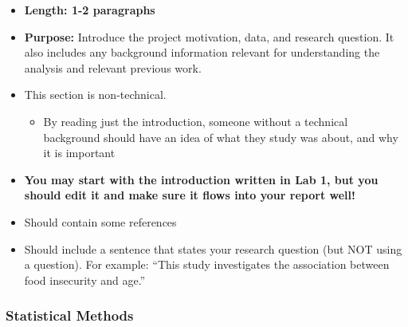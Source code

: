 \documentclass[
  letterpaper,
  DIV=11,
  numbers=noendperiod]{scrartcl}
\providecommand{\tightlist}{%
  \setlength{\itemsep}{0pt}\setlength{\parskip}{0pt}}\usepackage{longtable,booktabs,array}
\begin{document}
\begin{itemize}
\tightlist
\item
  \textbf{Length: 1-2 paragraphs}
\item
  \textbf{Purpose:} Introduce the project motivation, data, and research
  question. It also includes any background information relevant for
  understanding the analysis and relevant previous work.
\item
  This section is non-technical.

  \begin{itemize}
  \tightlist
  \item
    By reading just the introduction, someone without a technical
    background should have an idea of what they study was about, and why
    it is important
  \end{itemize}
\item
  {\textbf{You may start with the introduction written in Lab 1, but you
  should edit it and make sure it flows into your report well!}}
\item
  Should contain some references
\item
  Should include a sentence that states your research question (but NOT
  using a question). For example: ``This study investigates the
  association between food insecurity and age.''
\end{itemize}

\subsubsection{Statistical Methods}\label{statistical-methods}
\end{document}
